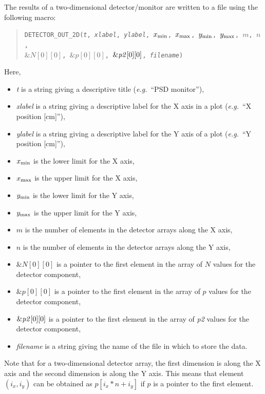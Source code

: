 The results of a two-dimensional detector/\discretionary{}{}{}mon\-i\-tor are written to a file using the
following macro:
\begin{quote}
  \texttt{DETECTOR\_OUT\_2D({\it t},
        {\it xlabel},
        {\it ylabel},
        $x_{\rm min}$, $x_{\rm max}$, $y_{\rm min}$, $y_{\rm max}$, $m$, $n$,\\
          $\&N[0][0]$, $\&p[0][0]$, $\&{\it p2}[0][0]$,
        {\it filename})}
\end{quote}
Here,
\begin{itemize}
\item \textit{t} is a string giving a descriptive title ({\em e.g.}\ ``PSD
  monitor''),
\item \textit{xlabel} is a string giving a descriptive label for the X
  axis in a plot ({\em e.g.}\ ``X position [cm]''),
\item \textit{ylabel} is a string giving a descriptive label for the Y
  axis of a plot ({\em e.g.}\ ``Y position [cm]''),
\item $x_{\rm min}$ is the lower limit for the X axis,
\item $x_{\rm max}$ is the upper limit for the X axis,
\item $y_{\rm min}$ is the lower limit for the Y axis,
\item $y_{\rm max}$ is the upper limit for the Y axis,
\item $m$ is the number of elements in the detector arrays along the X axis,
\item $n$ is the number of elements in the detector arrays along the Y axis,
\item $\&N[0][0]$ is a pointer to the first element in the array of $N$
  values for the detector component,
\item $\&p[0][0]$ is a pointer to the first element in the array of $p$
  values for the detector component,
\item $\&{\it p2}[0][0]$ is a pointer to the first element in the array of
  {\it p2} values for the detector component,
\item \textit{filename} is a string giving the name of the file in which
  to store the data.
\end{itemize}
Note that for a two-dimensional detector array, the first dimension is
along the X axis and the second dimension is along the Y axis. This
means that element $(i_x,i_y)$ can be obtained as $p[i_x*n+i_y]$ if $p$
is a pointer to the first element.

